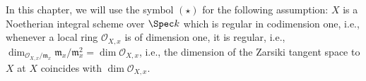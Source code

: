 In this chapter, we will use the symbol $(\star)$ for the following assumption: $X$ is a Noetherian
integral scheme over $\Spec k$ which is regular in codimension one, i.e., whenever a local ring $\mathcal{O}_{X, x}$
is of dimension one, it is regular, i.e., $\dim_{\mathcal{O}_{X, x}/\mathfrak{m}_x} \mathfrak{m}_x/\mathfrak{m}_x^2 = \dim \mathcal{O}_{X, x}$,
i.e., the dimension of the Zarsiki tangent space to $X$ at $X$ coincides with $\dim \mathcal{O}_{X, x}$.
